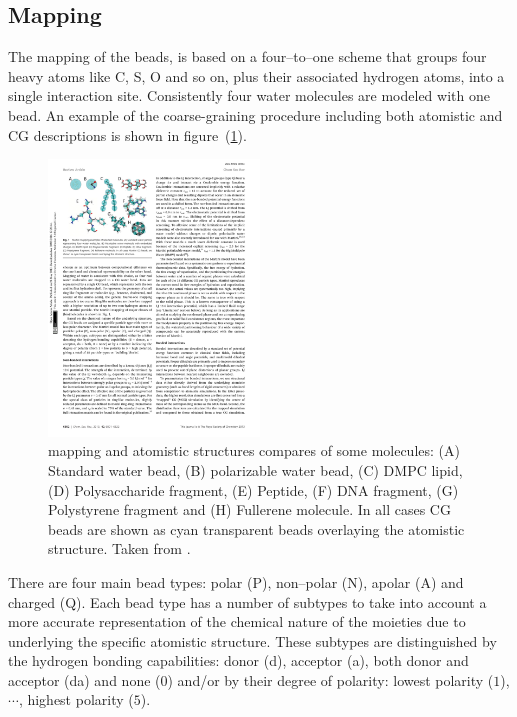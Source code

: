 \subsection{Mapping}
The mapping of the \martini beads, is based on a four--to--one scheme that groups four heavy atoms like C, S, O and so on, plus their associated hydrogen atoms, into a single interaction site. Consistently four water molecules are modeled with one \martini bead. An example of the coarse-graining procedure including both atomistic and \ac{CG} descriptions is shown in figure~(\ref{fig:martiniMapping}).
\begin{figure}[!ht]
	\centering
	\includegraphics[width=0.5\textwidth]{img/martiniMapping}
	\caption{\martini mapping and atomistic structures compares of some molecules: (A) Standard water bead, (B) polarizable water bead, (C) \acs{DMPC} lipid, (D) Polysaccharide fragment, (E) Peptide, (F) \acs{DNA} fragment, (G) Polystyrene fragment and (H) Fullerene molecule. In all cases \martini \acs{CG} beads are shown as cyan transparent beads overlaying the atomistic structure. Taken from \cite{MartiniReview}.}
	\label{fig:martiniMapping}
\end{figure}

There are four main bead types: polar (P), non--polar (N), apolar (A) and charged (Q). Each bead type has a number of subtypes to take into account a more accurate representation of the chemical nature of the moieties due to underlying the specific atomistic structure. These subtypes are distinguished by the hydrogen bonding capabilities: donor (d), acceptor (a), both donor and acceptor (da) and none ($0$) and/or by their degree of polarity: lowest polarity ($1$), $\cdots$, highest polarity ($5$).

